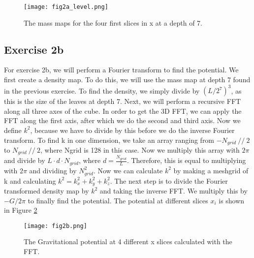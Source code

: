 \begin{figure}[h!]
  \centering
  \texttt{[image: fig2a\_level.png]}
  \caption{The mass maps for the four first slices in x at a depth of 7.}
  \label{fig:2a3}
\end{figure}

\subsection{Exercise 2b}

For exercise 2b, we will perform a Fourier transform to find the potential. We first create a density map. To do this, we will use the mass map at depth 7 found in the previous exercise. To find the density, we simply divide by $(L/2^7)^3$, as this is the size of the leaves at depth 7. Next, we will perform a recursive FFT along all three axes of the cube. In order to get the 3D FFT, we can apply the FFT along the first axis, after which we do the second and third axis. Now we define $k^2$, because we have to divide by this before we do the inverse Fourier transform. To find k in one dimension, we take an array ranging from $-N_{grid}\ //\ 2 $ to $N_{grid}\ // \ 2$, where Ngrid is 128 in this case. Now we multiply this array with $2\pi$ and divide by $L \cdot d \cdot N_{grid}$, where $d = \frac{N_{grid}}{L}$. Therefore, this is equal to multiplying with $2\pi$ and dividing by $N_{grid}^2$. Now we can calculate $k^2$ by making a meshgrid of k and calculating $k^2 = k_x^2 + k_y^2 + k_z^2$. The next step is to divide the Fourier transformed density map by $k^2$ and taking the inverse FFT. We multiply this by $-G/2\pi$ to finally find the potential. The potential at different slices $x_i$ is shown in Figure \ref{fig:2b} 

\begin{figure}[h!]
  \centering
  \texttt{[image: fig2b.png]}
  \caption{The Gravitational potential at 4 different x slices calculated with the FFT.}
  \label{fig:2b}
\end{figure}

